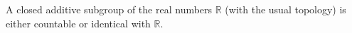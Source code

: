 A closed additive subgroup of the real numbers $\mathbb{R}$ (with the usual topology) is either countable or identical with $\mathbb{R}$.
